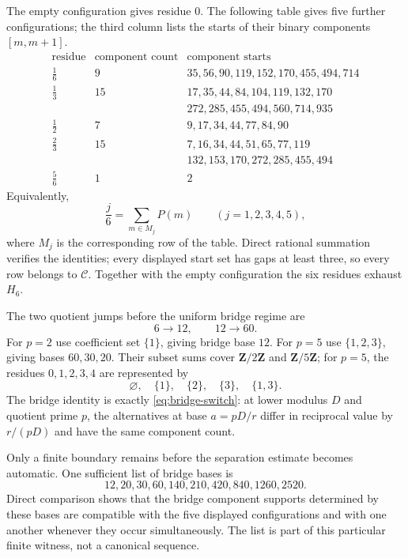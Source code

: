 The empty configuration gives residue $0$.  The following table gives five further configurations; the third column lists the starts of their binary components $[m,m+1]$.
\begin{equation}\label{eq:prefix-root-table}
\begin{array}{c|c|l}
\text{residue}&\text{component count}&\text{component starts}\\
\hline
\frac16&9&35,56,90,119,152,170,455,494,714\\
\frac13&15&17,35,44,84,104,119,132,170\\
&&272,285,455,494,560,714,935\\
\frac12&7&9,17,34,44,77,84,90\\
\frac23&15&7,16,34,44,51,65,77,119\\
&&132,153,170,272,285,455,494\\
\frac56&1&2
\end{array}
\end{equation}
Equivalently,
\[
\frac j6=\sum_{m\in M_j}P(m)
\qquad(j=1,2,3,4,5),
\]
where $M_j$ is the corresponding row of the table.  Direct rational summation verifies the identities; every displayed start set has gaps at least three, so every row belongs to $\mathcal C$.  Together with the empty configuration the six residues exhaust $H_6$.

The two quotient jumps before the uniform bridge regime are
\[
6\longrightarrow12,
\qquad
12\longrightarrow60.
\]
For $p=2$ use coefficient set $\{1\}$, giving bridge base $12$.  For $p=5$ use $\{1,2,3\}$, giving bases $60,30,20$.  Their subset sums cover $\mathbf Z/2\mathbf Z$ and $\mathbf Z/5\mathbf Z$; for $p=5$, the residues $0,1,2,3,4$ are represented by
\[
\varnothing,\quad\{1\},\quad\{2\},\quad\{3\},\quad\{1,3\}.
\]
The bridge identity is exactly \eqref{eq:bridge-switch}: at lower modulus $D$ and quotient prime $p$, the alternatives at base $a=pD/r$ differ in reciprocal value by $r/(pD)$ and have the same component count.

Only a finite boundary remains before the separation estimate becomes automatic.  One sufficient list of bridge bases is
\begin{equation}\label{eq:prefix-boundary-bases}
12,20,30,60,140,210,420,840,1260,2520.
\end{equation}
Direct comparison shows that the bridge component supports determined by these bases are compatible with the five displayed configurations and with one another whenever they occur simultaneously.  The list is part of this particular finite witness, not a canonical sequence.

